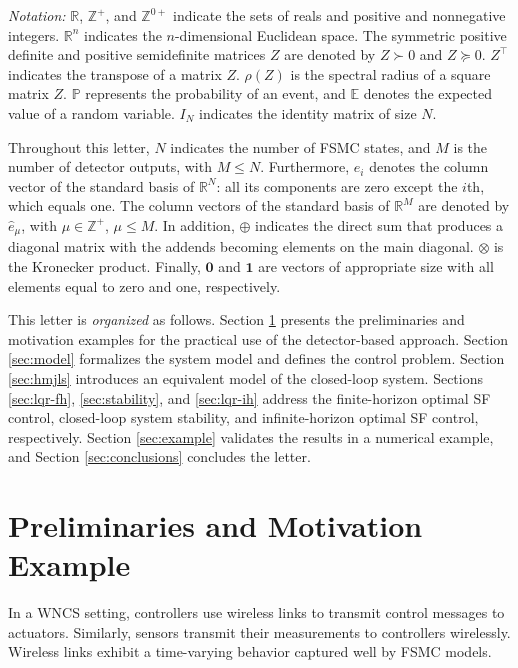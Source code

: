 \documentclass[letterpaper, 10 pt, conference]{ieeeconf}  %
\begin{document}
\textit{Notation:} $\mathbb{R}$, $\mathbb{Z}^{+}$, and $\mathbb{Z}^{0+}$ indicate the sets of reals and positive and nonnegative integers. $\mathbb{R}^{n}$ indicates the $n$-dimensional Euclidean space. The symmetric positive definite and positive semidefinite matrices $Z$ are denoted by $Z\succ 0$ and $Z\succeq 0$. $Z^{\top}$ indicates the transpose of a matrix $Z$. $\rho(Z)$ is the spectral radius of a square matrix $Z$. 
$\mathbb{P}$ represents the probability of an event, and $\mathbb{E}$ denotes the expected value of a random variable. $I_N$ indicates the identity matrix of size $N$. 

Throughout this letter, $N$ indicates the number of FSMC states, and $M$ is the number of detector outputs, with $M\leq N$.
Furthermore, $e_i$ denotes the column vector of the standard basis of $\mathbb{R}^{N}$: all its components are zero except the $i$th, which equals one. The column vectors of the standard basis of $\mathbb{R}^{M}$ are denoted by $\hat{e}_{\mu}$, with $\mu\in\mathbb{Z}^{+}$, $\mu\leq M$. In addition, $\oplus$ indicates the direct sum that produces a diagonal matrix with the addends becoming elements on the main diagonal. $\otimes$ is the Kronecker product. Finally, $\mathbf{0}$ and $\mathbf{1}$ are vectors of appropriate size with all elements equal to zero and one, respectively.

This letter is \emph{organized} as follows. 
Section \ref{sec:prelim} presents the preliminaries and motivation examples for the practical use of the detector-based approach.
Section \ref{sec:model} formalizes the system model and defines the control problem.
Section \ref{sec:hmjls} introduces an equivalent model of the closed-loop system.
Sections \ref{sec:lqr-fh}, \ref{sec:stability}, and \ref{sec:lqr-ih} address the finite-horizon optimal SF control, closed-loop system stability, and infinite-horizon optimal SF control, respectively.
Section \ref{sec:example} validates the results in a numerical example, and 
Section \ref{sec:conclusions} concludes the letter.

\section{Preliminaries and Motivation Example}\label{sec:prelim}
In a WNCS setting, controllers use wireless links to transmit control messages to actuators. 
Similarly, sensors transmit their measurements to controllers wirelessly. Wireless links exhibit a time-varying behavior captured well by FSMC models. 
\end{document}

